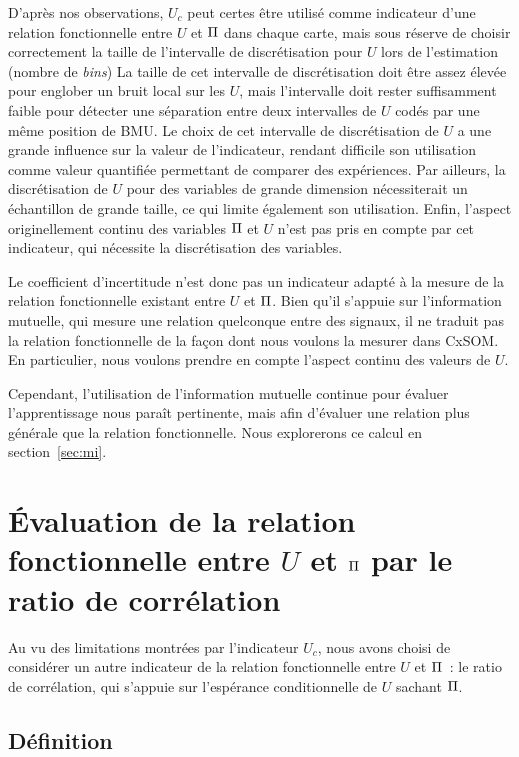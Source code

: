 \documentclass[../main]{subfiles}
\begin{document}
D'après nos observations, $U_c$ peut certes être utilisé comme indicateur d'une relation fonctionnelle entre $U$ et $\Pi$ dans chaque carte, mais sous réserve de choisir correctement la taille de l'intervalle de discrétisation pour $U$ lors de l'estimation (nombre de \emph{bins})
La taille de cet intervalle de discrétisation doit être assez élevée pour englober un bruit local sur les $U$, mais l'intervalle doit rester suffisamment faible pour détecter une séparation entre deux intervalles de $U$ codés par une même position de BMU.
Le choix de cet intervalle de discrétisation de $U$ a une grande influence sur la valeur de l'indicateur, rendant difficile son utilisation comme valeur quantifiée permettant de comparer des expériences.
Par ailleurs, la discrétisation de $U$ pour des variables de grande dimension nécessiterait un échantillon de grande taille, ce qui limite également son utilisation.
Enfin, l'aspect originellement continu des variables $\Pi$ et $U$ n'est pas pris en compte par cet indicateur, qui nécessite la discrétisation des variables.

Le coefficient d'incertitude n'est donc pas un indicateur adapté à la mesure de la relation fonctionnelle existant entre $U$ et $\Pi$. Bien qu'il s'appuie sur l'information mutuelle, qui mesure une relation quelconque entre des signaux, il ne traduit pas la relation fonctionnelle de la façon dont nous voulons la mesurer dans CxSOM. En particulier, nous voulons prendre en compte l'aspect continu des valeurs de $U$.

Cependant, l'utilisation de l'information mutuelle continue pour évaluer l'apprentissage nous paraît pertinente, mais afin d'évaluer une relation plus générale que la relation fonctionnelle.
Nous explorerons ce calcul en section~\ref{sec:mi}.

\section{\'Evaluation de la relation fonctionnelle entre $U$ et $\Pi$ par le ratio de corrélation}

Au vu des limitations montrées par l'indicateur $U_c$, nous avons choisi de considérer un autre indicateur de la relation fonctionnelle entre $U$ et $\Pi$~: le ratio de corrélation, qui s'appuie sur l'espérance conditionnelle de $U$ sachant $\Pi$.

\subsection{Définition}
\end{document}

